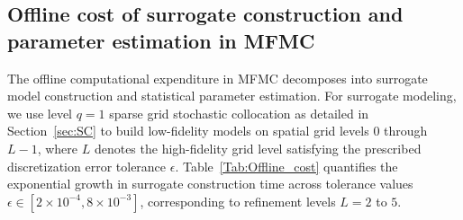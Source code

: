 \subsection{Offline cost of surrogate construction and parameter estimation in MFMC}
The offline computational expenditure in MFMC decomposes into surrogate model construction and statistical parameter estimation. For surrogate modeling, we use level $q=1$ sparse grid stochastic collocation as detailed in Section~\ref{sec:SC} to build low-fidelity models on spatial grid levels $0$ through $L-1$, where $L$ denotes the high-fidelity grid level satisfying the prescribed discretization error tolerance $\epsilon$. Table~\ref{Tab:Offline_cost} quantifies the exponential growth in surrogate construction time across tolerance values $\epsilon \in [2\times 10^{-4}, 8\times 10^{-3}]$, corresponding to refinement levels $L = 2$ to $5$.
%
\begin{table}[ht]
\centering
{}
\caption{Offline computational costs for MFMC implementation. Row 2: spatial level $L$ ensures discretization error control. Row 3: CPU time in seconds of surrogate construction uses 25 sparse grids nodes on spatial grid level from $0$ to $L-1$. }
\label{Tab:Offline_cost}
\end{table}
%




